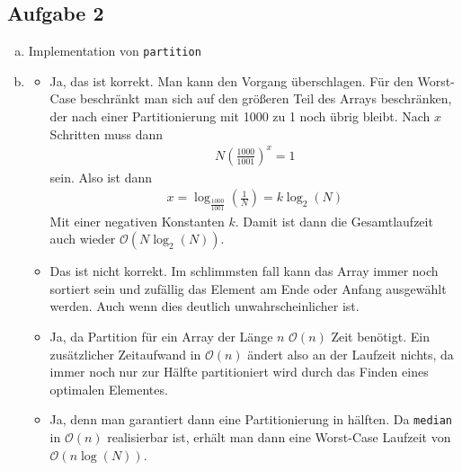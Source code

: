 \documentclass[11pt]{article}
\begin{document}
\subsection*{Aufgabe 2}
\begin{enumerate}[a)]
  \item Implementation von \texttt{partition}
    
  \item
    \begin{itemize}
      \item Ja, das ist korrekt. Man kann den Vorgang überschlagen.
        Für den Worst-Case beschränkt man sich auf den größeren Teil des
        Arrays beschränken, der nach einer Partitionierung mit
        1000 zu 1 noch übrig bleibt. Nach $x$ Schritten muss dann
        \begin{align*}
          N \left( \frac{1000}{1001} \right)^x = 1
        \end{align*}
        sein.
        Also ist dann
        \begin{align*}
          x = \log_{\frac{1000}{1001}} (\frac{1}{N}) =  k \log_2(N)
        \end{align*}
        Mit einer negativen Konstanten $k$. Damit ist dann die Gesamtlaufzeit auch
        wieder $\mathcal{O}(N \log_2(N))$.

      \item Das ist nicht korrekt. Im schlimmsten fall kann das Array immer
        noch sortiert sein und zufällig das Element am Ende oder Anfang ausgewählt
        werden. Auch wenn dies deutlich unwahrscheinlicher ist.

      \item Ja, da Partition für ein Array der Länge $n$ $\mathcal{O}(n)$
        Zeit benötigt. Ein zusätzlicher Zeitaufwand in $\mathcal{O}(n)$ ändert
        also an der Laufzeit nichts, da immer noch nur zur Hälfte partitioniert
        wird durch das Finden eines optimalen Elementes.

      \item Ja, denn man garantiert dann eine Partitionierung in hälften.
        Da \texttt{median} in $\mathcal{O}(n)$ realisierbar ist, erhält man
        dann eine Worst-Case Laufzeit von $\mathcal{O}(n \log(N))$.

    \end{itemize}
\end{enumerate} 
\end{document}
